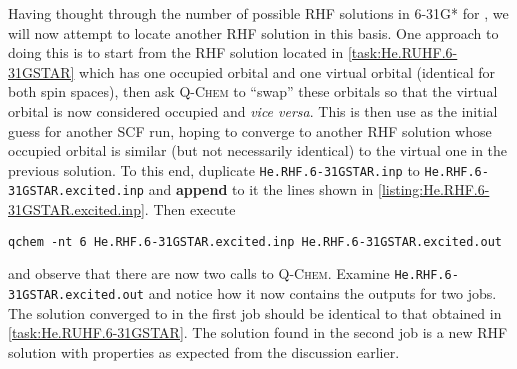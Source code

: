 			Having thought through the number of possible RHF solutions in 6-31G* for , we will now attempt to locate another RHF solution in this basis.
			One approach to doing this is to start from the RHF solution located in \cref{task:He.RUHF.6-31GSTAR} which has one occupied orbital and one virtual orbital (identical for both spin spaces), then ask \textsc{Q-Chem} to ``swap'' these orbitals so that the virtual orbital is now considered occupied and \textit{vice versa}.
			This is then use as the initial guess for another SCF run, hoping to converge to another RHF solution whose occupied orbital is similar (but not necessarily identical) to the virtual one in the previous solution.
			To this end, duplicate \texttt{He.RHF.6-31GSTAR.inp} to \texttt{He.RHF.6-31GSTAR.excited.inp} and \textbf{append} to it the lines shown in \cref{listing:He.RHF.6-31GSTAR.excited.inp}.
			Then execute
				\begin{lstlisting}[style = custombash]
					qchem -nt 6 He.RHF.6-31GSTAR.excited.inp He.RHF.6-31GSTAR.excited.out
				\end{lstlisting}
			and observe that there are now two calls to \textsc{Q-Chem}.
			Examine \texttt{He.RHF.6-31GSTAR.excited.out} and notice how it now contains the outputs for two jobs.
			The solution converged to in the first job should be identical to that obtained in \cref{task:He.RUHF.6-31GSTAR}.
			The solution found in the second job is a new RHF solution with properties as expected from the discussion earlier.
				
			
